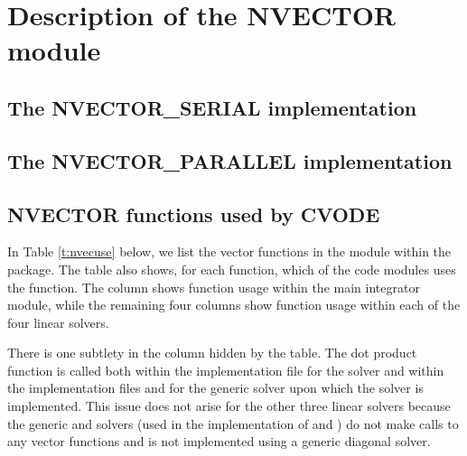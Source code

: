 \chapter{Description of the NVECTOR module}\label{s:nvector}


\section{The NVECTOR\_SERIAL implementation}\label{ss:nvec_ser}


\section{The NVECTOR\_PARALLEL implementation}\label{ss:nvec_par}


\section{NVECTOR functions used by CVODE}

In Table \ref{t:nvecuse} below, we list the vector functions in the 
{\nvector} module within the {\cvode} package.
The table also shows, for each function, which of the code modules uses
the function. The {\cvode} column shows function usage within the main
integrator module, while the remaining four columns show function usage
within each of the four {\cvode} linear solvers. 

There is one subtlety in the {\cvspgmr} column hidden by the table. 
The dot product function  is called both within the 
implementation file  for the {\cvspgmr} solver and within 
the implementation files  and  for the generic {\spgmr} 
solver upon which the {\cvspgmr} solver is implemented. 
This issue does not arise for the other 
three {\cvode} linear solvers because the generic {\dense} and {\band} solvers 
(used in the implementation of {\cvdense} and {\cvband}) do not make calls to 
any vector functions and {\cvdiag} is not implemented using a generic diagonal solver. 

